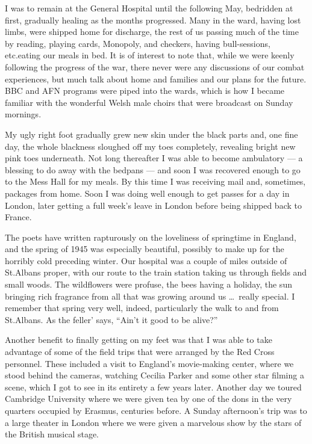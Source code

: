 \documentclass[../m3y]{subfiles}
\begin{document}
I was to remain at the  General Hospital until the following May, bedridden at first, gradually healing as the months progressed. Many in the ward, having lost limbs, were shipped home for discharge, the rest of us passing much of the time by reading, playing cards, Monopoly, and checkers, having bull-sessions, etc.\@ eating our meals in bed. It is of interest to note that, while we were keenly following the progress of the war, there never were any discussions of our combat experiences, but much talk about home and families and our plans for the future. BBC and AFN programs were piped into the wards, which is how I became familiar with the wonderful Welsh male choirs that were broadcast on Sunday mornings.

My ugly right foot gradually grew new skin under the black parts and, one fine day, the whole blackness sloughed off my toes completely, revealing bright new pink toes underneath. Not long thereafter I was able to become ambulatory --- a blessing to do away with the bedpans --- and soon I was recovered enough to go to the Mess Hall for my meals. By this time I was receiving mail and, sometimes, packages from home. Soon I was doing well enough to get passes for a day in London, later getting a full week's leave in London before being shipped back to France.

The poets have written rapturously on the loveliness of springtime in England, and the spring of 1945 was especially beautiful, possibly to make up for the horribly cold preceding winter. Our hospital was a couple of miles outside of St.\@ Albans proper, with our route to the train station taking us through fields and small woods. The wildflowers were profuse, the bees having a holiday, the sun bringing rich fragrance from all that was growing around us \ldots\ really special. I remember that spring very well, indeed, particularly the walk to and from St.\@ Albans. As the feller' says, ``Ain't it good to be alive?''

Another benefit to finally getting on my feet was that I was able to take advantage of some of the field trips that were arranged by the Red Cross personnel. These included a visit to England's movie-making center, where we stood behind the cameras, watching Cecilia Parker and some other star filming a scene, which I got to see in its entirety a few years later. Another day we toured Cambridge University where we were given tea by one of the dons in the very quarters occupied by Erasmus, centuries before. A Sunday afternoon's trip was to a large theater in London where we were given a marvelous show by the stars of the British musical stage.
\end{document}

